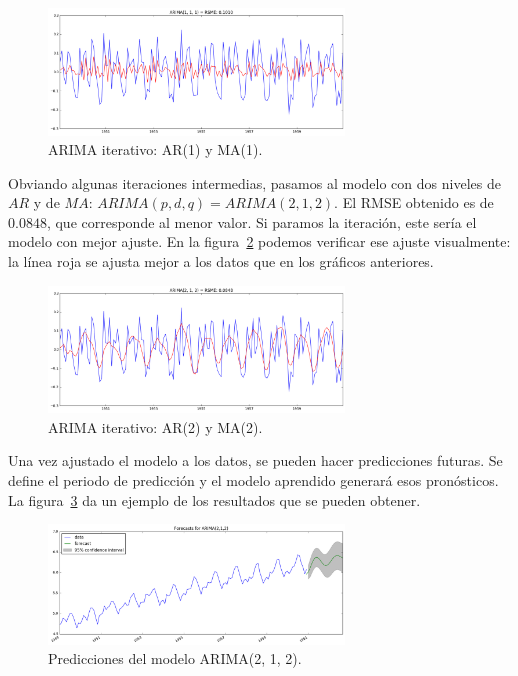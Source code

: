 \documentclass[11pt,spanish,listoffigures,listoftables]{tfgetsinf}
\begin{document}
    \begin{figure}[H]
        \centering
        \includegraphics[width=0.7\textwidth]{arima_log_111.png}
        \caption{ARIMA iterativo: AR(1) y MA(1).}
        \label{fig:iterative_arima_arma_1}
    \end{figure}
        
    Obviando algunas iteraciones intermedias, pasamos al modelo con dos niveles de \(AR\) y de \(MA\): \(ARIMA(p, d, q)=ARIMA(2, 1, 2)\). El RMSE obtenido es de \(0.0848\), que corresponde al menor valor. Si paramos la iteración, este sería el modelo con mejor ajuste. En la figura~\ref{fig:iterative_arima_arma_2} podemos verificar ese ajuste visualmente: la línea roja se ajusta mejor a los datos que en los gráficos anteriores.
  
    \begin{figure}[H]
        \centering
        \includegraphics[width=0.7\textwidth]{arima_log_212.png}
        \caption{ARIMA iterativo: AR(2) y MA(2).}
        \label{fig:iterative_arima_arma_2}
    \end{figure}

    Una vez ajustado el modelo a los datos, se pueden hacer predicciones futuras. Se define el periodo de predicción y el modelo aprendido generará esos pronósticos. La figura~\ref{fig:forecast} da un ejemplo de los resultados que se pueden obtener. 

    \begin{figure}[h]
        \centering
        \includegraphics[width=0.7\textwidth]{arima_log_forecast.png}
        \caption{Predicciones del modelo ARIMA(2, 1, 2).}
        \label{fig:forecast}
    \end{figure}
\end{document}
